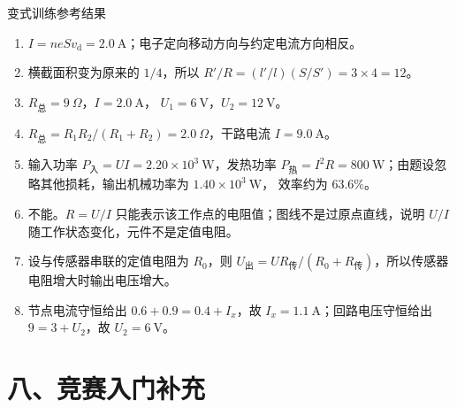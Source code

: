 \begin{learningbox}{变式训练参考结果}
\begin{enumerate}[itemsep=0.45em,topsep=0.3em,parsep=0pt]
  \item $I=neSv_{\mathrm d}=2.0\ \mathrm A$；电子定向移动方向与约定电流方向相反。
  \item 横截面积变为原来的 $1/4$，所以
  $R'/R=(l'/l)(S/S')=3\times4=12$。
  \item $R_{\text{总}}=9\ \Omega$，$I=2.0\ \mathrm A$，
  $U_1=6\ \mathrm V$，$U_2=12\ \mathrm V$。
  \item $R_{\text{总}}=R_1R_2/(R_1+R_2)=2.0\ \Omega$，干路电流
  $I=9.0\ \mathrm A$。
  \item 输入功率 $P_{\text{入}}=UI=2.20\times10^3\ \mathrm W$，发热功率
  $P_{\text{热}}=I^2R=800\ \mathrm W$；由题设忽略其他损耗，输出机械功率为 $1.40\times10^3\ \mathrm W$，
  效率约为 $63.6\%$。
  \item 不能。$R=U/I$ 只能表示该工作点的电阻值；图线不是过原点直线，说明
  $U/I$ 随工作状态变化，元件不是定值电阻。
  \item 设与传感器串联的定值电阻为 $R_0$，则
  $U_{\text{出}}=UR_{\text{传}}/(R_0+R_{\text{传}})$，所以传感器电阻增大时输出电压增大。
  \item 节点电流守恒给出 $0.6+0.9=0.4+I_x$，故
  $I_x=1.1\ \mathrm A$；回路电压守恒给出
  $9=3+U_2$，故 $U_2=6\ \mathrm V$。
\end{enumerate}
\end{learningbox}

\section*{八、竞赛入门补充}

